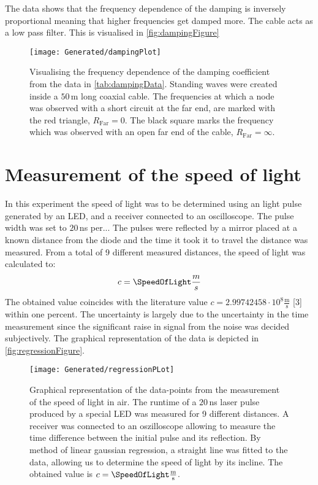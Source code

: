 \documentclass[a4paper,10pt,twocolumn]{article}
\begin{document}
    The data shows that the frequency dependence of the damping is inversely proportional meaning that higher frequencies get damped more.
    The cable acts as a low pass filter.
    This is visualised in \autoref{fig:dampingFigure}
    \begin{figure}
    \begin{center}
        \texttt{[image: Generated/dampingPlot]}
        \caption[]{Visualising the frequency dependence of the damping coefficient from the data in \autoref{tab:dampingData}.
        Standing waves were created inside a $50\,$m long coaxial cable.
        The frequencies at which a node was observed with a short circuit at the far end, are marked with the red triangle, $R_{\text{Far}}=0$.
        The black square marks the frequency which was observed with an open far end of the cable, $R_{\text{Far}}=\infty$.}   %
        \label{fig:dampingFigure}
    \end{center}
    \end{figure}
    
    \section{Measurement of the speed of light}
    \label{sec:speedOfLightMeasurement}
    In this experiment the speed of light was to be determined using an light pulse generated by an LED, and a receiver connected to an oscilloscope.
    The pulse width was  set to $20\,$ns per... 
    The pulses were reflected by a mirror placed at a known distance from the diode and the time it took it to travel the distance was measured.
    From a total of 9 different measured distances, the speed of light was calculated to:
    \begin{align}
        c = \SpeedOfLight \frac{m}{s}
    \end{align}
    The obtained value coincides with the literature value $c  = 2.99742458\cdot10^8 \frac{\text{m}}{\text{s}}$ [3] within one percent.
    The uncertainty is largely due to the uncertainty in the time measurement since the significant raise in signal from the noise was decided subjectively.
    The graphical representation of the data is depicted in \autoref{fig:regressionFigure}.
    \begin{figure}
        \begin{center}
            \texttt{[image: Generated/regressionPLot]}
            \caption[]{Graphical representation of the data-points from the measurement of the speed of light in air.
            The runtime of a $20\,$ns laser pulse produced by a special LED was measured for 9 different distances.
            A receiver was connected to an oszilloscope allowing to measure the time difference between the initial pulse and its reflection.
            By method of linear gaussian regression, a straight line was fitted to the data, allowing us to determine the speed of light by its incline.
            The obtained value is $c =\SpeedOfLight \frac{\text{m}}{\text{s}}$.
            }  
            \label{fig:regressionFigure}
        \end{center}
    \end{figure}
\end{document}
